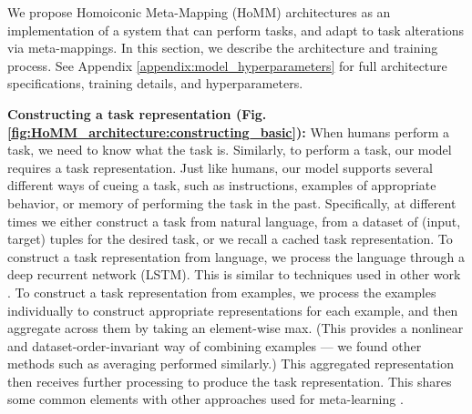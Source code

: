 We propose Homoiconic Meta-Mapping (HoMM) architectures as an implementation of a system that can perform tasks, and adapt to task alterations via meta-mappings. In this section, we describe the architecture and training process. See Appendix \ref{appendix:model_hyperparameters} for full architecture specifications, training details, and hyperparameters. 

\textbf{Constructing a task representation (Fig. \ref{fig:HoMM_architecture:constructing_basic}):} When humans perform a task, we need to know what the task is. Similarly, to perform a task, our model requires a task representation. Just like humans, our model supports several different ways of cueing a task, such as instructions, examples of appropriate behavior, or memory of performing the task in the past. Specifically, at different times we either construct a task from natural language, from a dataset of (input, target) tuples for the desired task, or we recall a cached task representation. To construct a task representation from language, we process the language through a deep recurrent network (LSTM). This is similar to techniques used in other work \citep[e.g.]{Hermann2017,Oh2017a,Hill2019a}. To construct a task representation from examples, we process the examples individually to construct appropriate representations for each example, and then aggregate across them by taking an element-wise max. (This provides a nonlinear and dataset-order-invariant way of combining examples --- we found other methods such as averaging performed similarly.) This aggregated representation then receives further processing to produce the task representation. This shares some common elements with other approaches used for meta-learning \citep{Garnelo2018}. 

